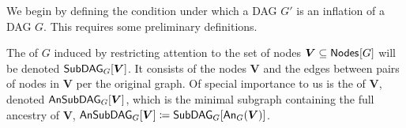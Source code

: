 

We begin by defining the condition under which a DAG $G'$  is an inflation of a DAG $G$.  This requires some preliminary definitions. 

The  of $G$ induced by restricting attention to the set of nodes $\bm{V}\subseteq \SmallNamedFunction{Nodes}{G}$ will be denoted $\subgraph[G]{\bm{V}}$.
It consists of the nodes $\bm{V}$ and the edges between pairs of nodes in $\bm{V}$ per the original graph. Of special importance to us is the 
 of $\bm{V}$, denoted $\ansubgraph[G]{\bm{V}}$, which is the minimal subgraph containing the full ancestry of $\bm{V}$, $\ansubgraph[G]{\bm{V}}\coloneqq\subgraph[G]{\An[G]{\bm{V}}}$. 

